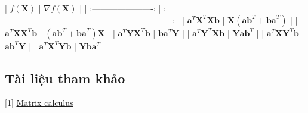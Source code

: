 \documentclass[12pt]{article}
\begin{document}
| $f(\mathbf{X}) $                                   | $ \nabla f(\mathbf{X}) $                                   | 
| :----------------------:                               | :------------------------------------------------------------: | 
| $ \mathbf{a}^T \mathbf{X}^T \mathbf{Xb}$           | $ \mathbf{X}(\mathbf{ab}^T + \mathbf{ba}^T)        $       | 
| $ \mathbf{a}^T \mathbf{X} \mathbf{X}^T \mathbf{b}$ | $ (\mathbf{ab}^T + \mathbf{ba}^T)\mathbf{X}        $       | 
| $ \mathbf{a}^T \mathbf{Y} \mathbf{X}^T \mathbf{b}$ | $ \mathbf{b}\mathbf{a}^T \mathbf{Y}        $               | 
| $ \mathbf{a}^T \mathbf{Y}^T \mathbf{X} \mathbf{b}$ | $ \mathbf{Y}\mathbf{a}\mathbf{b}^T         $               | 
| $ \mathbf{a}^T \mathbf{X} \mathbf{Y}^T \mathbf{b}$ | $ \mathbf{a}\mathbf{b}^T\mathbf{Y}         $               | 
| $ \mathbf{a}^T \mathbf{X}^T \mathbf{Y} \mathbf{b}$ | $ \mathbf{Y}\mathbf{b}\mathbf{a}^T         $               | 
 
 
\subsection{Tài liệu tham khảo }
[1] \href{https://ccrma.stanford.edu/~dattorro/matrixcalc.pdf}{Matrix calculus} 
 
 
 
\end{document}
